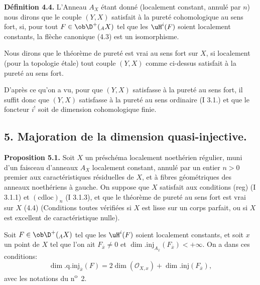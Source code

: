 \textbf{Définition 4.4.} L'Anneau $A_X$ étant donné (localement constant, annulé par $n$) nous dirons que le couple $(Y,X)$ satisfait à la pureté cohomologique au sens fort, si, pour tout $F\in\ob\D^+({}_A X)$ tel que les $\uH^i(F)$ soient localement constants, la flèche canonique (4.3) est un isomorphisme.

Nous dirons que le théorème de pureté est vrai au sens fort sur $X$, si localement (pour la topologie étale) tout couple $(Y,X)$ comme ci-dessus satisfait à la pureté au sens fort.

D'après ce qu'on a vu, pour que $(Y,X)$ satisfasse à la pureté au sens fort, il suffit donc que $(Y,X)$ satisfasse à la pureté au sens ordinaire (I 3.1.) et que le foncteur $i^!$ soit de dimension cohomologique finie.

\subsection*{5. Majoration de la dimension quasi-injective.}

\textbf{Proposition 5.1.} Soit $X$ un préschéma localement noethérien régulier, muni d'un faisceau d'anneaux $A_X$ localement constant, annulé par un entier $n>0$ premier aux caractéristiques résiduelles de $X$, et à fibres géométriques des anneaux noethériens à gauche. On suppose que $X$ satisfait aux conditions (reg) (I 3.1.1) et $(\mathrm{cdloc})_n$ (I 3.1.3), et que le théorème de pureté au sens fort est vrai sur $X$ (4.4) (Conditions toutes vérifiées si $X$ est lisse sur un corps parfait, ou si $X$ est excellent de caractéristique nulle).

Soit $F\in\ob\D^+({}_A X)$ tel que les $\uH^i(F)$ soient localement constants, et soit $x$ un point de $X$ tel que l'on ait $F_{\bar{x}}\neq0$ et $\dim.\mathrm{inj}_{A_{\bar{x}}}(F_{\bar{x}})<+\infty$. On a dans ces conditions:
\[
        \dim.\mathrm{q.inj}_{\bar{x}}(F)=2\dim(\mathcal{O}_{X,x})+\dim.\mathrm{inj}(F_{\bar{x}}),
\]
avec les notations du n\textsuperscript{o}~2.

